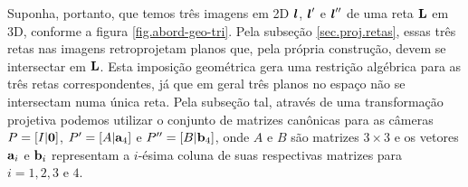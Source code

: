 Suponha, portanto, que temos três imagens em 2D $\boldsymbol{l}$, $\boldsymbol{l}'$ e $\boldsymbol{l}''$  de uma reta ${\bf L}$ em 3D, conforme a figura \ref{fig.abord-geo-tri}. Pela subseção \ref{sec.proj.retas}, essas três retas nas imagens retroprojetam planos que, pela própria construção, devem se intersectar em ${\bf L}$. Esta imposição geométrica gera uma restrição algébrica para as três retas correspondentes, já que em geral três planos no espaço não se intersectam numa única reta. Pela subseção tal, através de uma transformação projetiva podemos utilizar o conjunto de matrizes canônicas para as câmeras $P=[I|{\bf 0}]$, $P'=[A|{\bf a}_4]$ e $P''=[B|{\bf b}_4]$, onde $A$ e $B$ são matrizes $3\times3$ e os vetores ${\bf a}_i$ e ${\bf b}_i$ representam a $i$-ésima coluna de suas respectivas matrizes para $i=1,2,3 \,\,\text{e}\,\, 4$.


